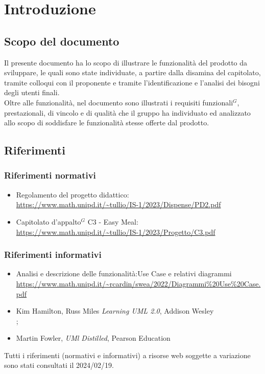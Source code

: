
\section{Introduzione}

\subsection{Scopo del documento}

Il presente documento ha lo scopo di illustrare le funzionalità del prodotto da sviluppare,
le quali sono state individuate, a partire dalla disamina del capitolato, tramite colloqui con
il proponente e tramite l'identificazione e l'analisi dei bisogni degli utenti finali.\\
Oltre alle funzionalità, nel documento sono illustrati i requisiti funzionali$^{G}$, prestazionali, di
vincolo e di qualità che il gruppo ha individuato ed analizzato allo scopo di soddisfare le
funzionalità stesse offerte dal prodotto.

\subsection{Riferimenti}
\subsubsection{Riferimenti normativi}

\begin{itemize}
    \item Regolamento del progetto didattico: \\
    \url{https://www.math.unipd.it/~tullio/IS-1/2023/Dispense/PD2.pdf}
    \item Capitolato d’appalto$^{G}$ C3 - Easy Meal: \\
    \url{https://www.math.unipd.it/~tullio/IS-1/2023/Progetto/C3.pdf}
\end{itemize}

\subsubsection{Riferimenti informativi}

\begin{itemize}
    \item Analisi e descrizione delle funzionalità:Use Case e relativi diagrammi \\
    \url{https://www.math.unipd.it/~rcardin/swea/2022/Diagrammi%20Use%20Case.pdf}
    \item Kim Hamilton, Russ Miles \emph{Learning UML 2.0}, Addison Wesley \\;
    \item Martin Fowler, \emph{UMl Distilled}, Pearson Education
\end{itemize}

Tutti i riferimenti (normativi e informativi) a risorse web soggette a variazione sono stati consultati il 2024/02/19.